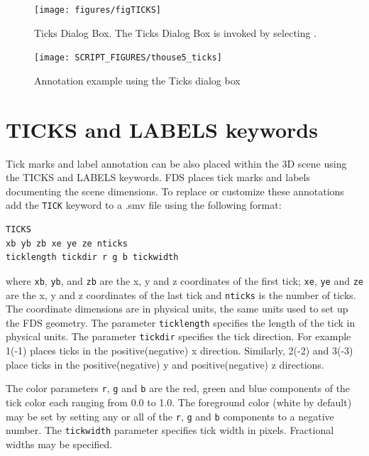 \documentclass[11pt,twoside]{book}
\newcommand{\figoptions}{hbp}
\newcommand{\frameit}[1]{\fbox{\tt #1}}
\begin{document}
\begin{figure}[\figoptions]
\centerline{
\texttt{[image: figures/figTICKS]}
}
\caption[Ticks Dialog Box.]{Ticks Dialog Box.  The
Ticks Dialog Box is invoked by selecting
\frameit{Dialogs$>$Display}. }
\label{figTICKSdialog}
\end{figure}

\begin{figure}[\figoptions]
\begin{center}
\texttt{[image: SCRIPT\_FIGURES/thouse5\_ticks]}
\end{center}
\caption{Annotation example using the Ticks dialog box}
\label{figTICKSdialogexample}%
\end{figure}


\section{TICKS and LABELS keywords}
Tick marks and label annotation
can be also placed within the 3D scene using the TICKS and LABELS keywords.
FDS places tick marks and labels
documenting the scene dimensions.  To replace or customize
these annotations add the {\tt TICK} keyword to a .smv file
using the following format:

\begin{verbatim}
TICKS
xb yb zb xe ye ze nticks
ticklength tickdir r g b tickwidth
\end{verbatim}

\noindent where {\tt xb}, {\tt yb}, and {\tt zb} are the x, y and
z coordinates of the first tick; {\tt xe}, {\tt ye} and {\tt ze}
are the x, y and z coordinates of the last tick and {\tt nticks}
is the number of ticks. The coordinate dimensions are in physical
units, the same units used to set up the FDS geometry. The
parameter {\tt ticklength} specifies the length of the tick in
physical units. The parameter {\tt tickdir} specifies the tick
direction.  For example 1(-1) places ticks in the
positive(negative) x direction. Similarly, 2(-2) and 3(-3) place
ticks in the positive(negative) y and positive(negative) z
directions.

The color parameters {\tt r}, {\tt g} and {\tt b} are the
red, green and blue components of the tick color each
ranging from 0.0 to 1.0. The foreground color (white by
default) may be set by setting any or all of the {\tt r},
{\tt g} and {\tt b} components to a negative number. The
{\tt tickwidth} parameter specifies tick width in pixels.
Fractional widths may be specified.
\end{document}
